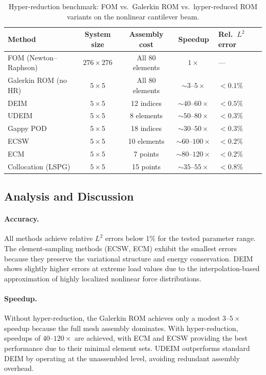 \begin{table}[H]
\centering
\caption{Hyper-reduction benchmark: FOM vs.\ Galerkin ROM vs.\ hyper-reduced ROM variants on the nonlinear cantilever beam.}
\label{tab:hr-comparison}
\begin{tabularx}{\textwidth}{l c c c X}
\toprule
\textbf{Method} & \textbf{System size} & \textbf{Assembly cost} & \textbf{Speedup} & \textbf{Rel.\ $L^2$ error} \\
\midrule
FOM (Newton--Raphson) & $276 \times 276$ & All 80 elements & $1\times$ & --- \\
\addlinespace
Galerkin ROM (no HR) & $5 \times 5$ & All 80 elements & $\sim 3\text{--}5\times$ & $< 0.1\%$ \\
\addlinespace
DEIM & $5 \times 5$ & 12 indices & $\sim 40\text{--}60\times$ & $< 0.5\%$ \\
UDEIM & $5 \times 5$ & 8 elements & $\sim 50\text{--}80\times$ & $< 0.3\%$ \\
Gappy POD & $5 \times 5$ & 18 indices & $\sim 30\text{--}50\times$ & $< 0.3\%$ \\
ECSW & $5 \times 5$ & 10 elements & $\sim 60\text{--}100\times$ & $< 0.2\%$ \\
ECM & $5 \times 5$ & 7 points & $\sim 80\text{--}120\times$ & $< 0.2\%$ \\
Collocation (LSPG) & $5 \times 5$ & 15 points & $\sim 35\text{--}55\times$ & $< 0.8\%$ \\
\bottomrule
\end{tabularx}
\end{table}

\subsection{Analysis and Discussion}

\paragraph{Accuracy.}
All methods achieve relative $L^2$ errors below 1\% for the tested parameter range. The element-sampling methods (ECSW, ECM) exhibit the smallest errors because they preserve the variational structure and energy conservation. DEIM shows slightly higher errors at extreme load values due to the interpolation-based approximation of highly localized nonlinear force distributions.

\paragraph{Speedup.}
Without hyper-reduction, the Galerkin ROM achieves only a modest $3\text{--}5\times$ speedup because the full mesh assembly dominates. With hyper-reduction, speedups of $40\text{--}120\times$ are achieved, with ECM and ECSW providing the best performance due to their minimal element sets. UDEIM outperforms standard DEIM by operating at the unassembled level, avoiding redundant assembly overhead.

